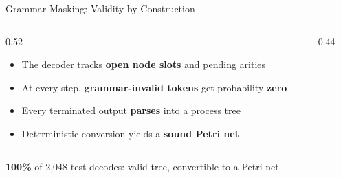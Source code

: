 \documentclass[aspectratio=169]{beamer}
\newcommand{\keyc}[1]{\textbf{\textcolor{procblue}{#1}}}
\newcommand{\keyg}[1]{\textbf{\textcolor{procgreen!70!black}{#1}}}
\newcommand{\keya}[1]{\textbf{\textcolor{procamber!85!black}{#1}}}
\begin{document}
\begin{frame}{Grammar Masking: Validity by Construction}
  \begin{columns}[T]
  \begin{column}{0.52\textwidth}
    \begin{itemize}\setlength{\itemsep}{7pt}
      \item The decoder tracks \keyc{open node slots} and pending arities
      \item At every step, \keya{grammar-invalid tokens} get probability \keya{zero}
      \item Every terminated output \keyg{parses} into a process tree
      \item Deterministic conversion yields a \keyg{sound Petri net}
    \end{itemize}
  \end{column}
  \begin{column}{0.44\textwidth}
    \begin{center}
    \end{center}
  \end{column}
  \end{columns}
  \vspace{3mm}
  \begin{block}{}
    \centering \keyg{100\%} of 2{,}048 test decodes: valid tree, convertible to a Petri net
  \end{block}
\end{frame}
\end{document}
